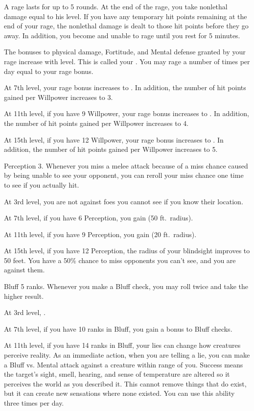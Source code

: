     A rage lasts for up to 5 rounds.
    At the end of the rage, you take nonlethal damage equal to his level.
    If you have any temporary hit points remaining at the end of your rage, the nonlethal damage is dealt to those hit points before they go away.
    In addition, you become \fatigued and unable to rage until you rest for 5 minutes.

    The bonuses to physical damage, Fortitude, and Mental defense granted by your rage increase with level.
    This is called your .
    You may rage a number of times per day equal to your rage bonus.

    At 7th level, your rage bonus increases to .
    In addition, the number of hit points gained per Willpower increases to 3.

    At 11th level, if you have 9 Willpower, your rage bonus increases to .
    In addition, the number of hit points gained per Willpower increases to 4.

    At 15th level, if you have 12 Willpower, your rage bonus increases to .
    In addition, the number of hit points gained per Willpower increases to 5.

    \featpre Perception 3.
    \featben Whenever you miss a melee attack because of a miss chance caused by being unable to see your opponent, you can reroll your miss chance one time to see if you actually hit.

    At 3rd level, you are not  against foes you cannot see if you know their location.

    At 7th level, if you have 6 Perception, you gain  (50 ft.\ radius).

    At 11th level, if you have 9 Perception, you gain  (20 ft.\ radius).

    At 15th level, if you have 12 Perception, the radius of your blindsight improves to 50 feet.
     You have a 50\% chance to miss opponents you can't see, and you are  against them.

    \featpre Bluff 5 ranks.
    \featben Whenever you make a Bluff check, you may roll twice and take the higher result.

    At 3rd level, \tdash.

    At 7th level, if you have 10 ranks in Bluff, you gain a  bonus to Bluff checks.

    At 11th level, if you have 14 ranks in Bluff, your lies can change how creatures perceive reality.
    As an immediate action, when you are telling a lie, you can make a Bluff vs. Mental attack against a creature within \rngmed range of you.
    Success means the target's sight, smell, hearing, and sense of temperature are altered so it perceives the world as you described it.
    This cannot remove things that do exist, but it can create new sensations where none existed.
    You can use this ability three times per day.

